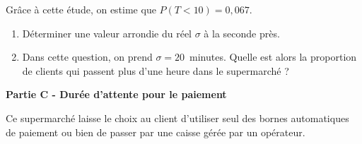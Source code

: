 \documentclass[10pt,a4paper]{article}
\begin{document}
Grâce à cette étude, on estime que $P(T < 10) = 0,067$.

\medskip

\begin{enumerate}
\item Déterminer une valeur arrondie du réel $\sigma$ à la seconde près.
\item Dans cette question, on prend $\sigma = 20$~minutes. Quelle est alors la proportion de clients qui
passent plus d'une heure dans le supermarché ?
\end{enumerate}

\bigskip

\textbf{Partie C - Durée d'attente pour le paiement}

\medskip

Ce supermarché laisse le choix au client d'utiliser seul des bornes automatiques de paiement ou
bien de passer par une caisse gérée par un opérateur.

\medskip
\end{document}
